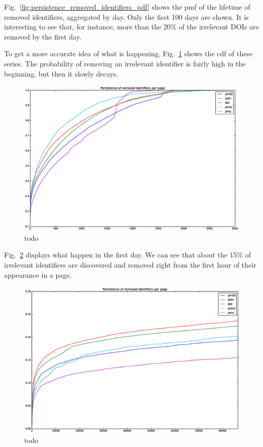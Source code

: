 Fig.~\ref{fig:persistence_removed_identifiers_pdf} shows the \ac{pmf} of the lifetime of removed identifiers, aggregated by day.
Only the first 100 days are shown.
It is interesting to see that, for instance, more than the 20\% of the irrelevant \acp{DOI} are removed by the first day.

To get a more accurate idea of what is happening, Fig.~\ref{fig:persistence_removed_identifiers_cdf_days} shows the \ac{cdf} of these series.
The probability of removing an irrelevant identifier is fairly high in the beginning, but then it slowly decays.

\begin{figure}[h]
\centering
\includegraphics[keepaspectratio=true, width=\textwidth]{assets/persistence_removed_identifiers_cdf_days}
\caption{todo}
\label{fig:persistence_removed_identifiers_cdf_days}
\end{figure}

Fig.~\ref{fig:persistence_removed_identifiers_cdf_first_day} displays what happen in the first day.
We can see that about the 15\% of irrelevant identifiers are discovered and removed right from the first hour of their appearance in a page.

\begin{figure}[h]
\centering
\includegraphics[keepaspectratio=true, width=\textwidth]{assets/persistence_removed_identifiers_cdf_first_day}
\caption{todo}
\label{fig:persistence_removed_identifiers_cdf_first_day}
\end{figure}

